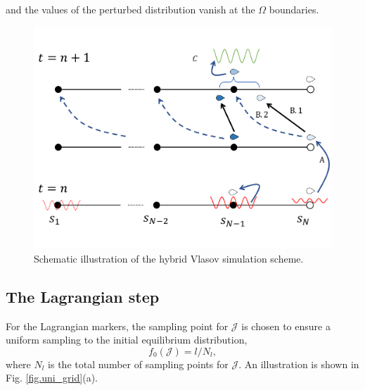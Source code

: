 and
the values of the perturbed distribution vanish at the $\Omega$ boundaries.
\begin{figure}[htbp]
    \centering
    \includegraphics[scale=0.5]{cpc_img/Hybrid_demo.pdf}
    \caption{Schematic illustration of the hybrid Vlasov simulation scheme.}
    \label{fig.demo}
\end{figure}

\subsection{The Lagrangian step}
For the Lagrangian markers,
the sampling point for $\mathcal{J}$ is chosen to ensure  a uniform sampling to the initial equilibrium distribution,
\begin{equation}
    f_0(\mathcal{J}) = l/N_l, 
\end{equation}
where $N_l$ is the total number of sampling points for $\mathcal{J}$. An illustration is shown in Fig. \ref{fig.uni_grid}(a).

